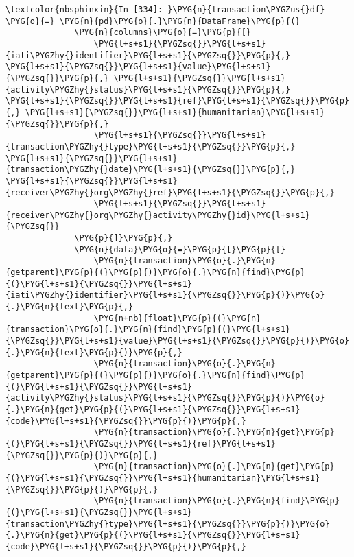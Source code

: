 \documentclass[letterpaper,10pt,english]{sphinxmanual}
\begin{document}
\begin{Verbatim}[commandchars=\\\{\}]
\textcolor{nbsphinxin}{In [334]: }\PYG{n}{transaction\PYGZus{}df} \PYG{o}{=} \PYG{n}{pd}\PYG{o}{.}\PYG{n}{DataFrame}\PYG{p}{(}
              \PYG{n}{columns}\PYG{o}{=}\PYG{p}{[}
                  \PYG{l+s+s1}{\PYGZsq{}}\PYG{l+s+s1}{iati\PYGZhy{}identifier}\PYG{l+s+s1}{\PYGZsq{}}\PYG{p}{,} \PYG{l+s+s1}{\PYGZsq{}}\PYG{l+s+s1}{value}\PYG{l+s+s1}{\PYGZsq{}}\PYG{p}{,} \PYG{l+s+s1}{\PYGZsq{}}\PYG{l+s+s1}{activity\PYGZhy{}status}\PYG{l+s+s1}{\PYGZsq{}}\PYG{p}{,} \PYG{l+s+s1}{\PYGZsq{}}\PYG{l+s+s1}{ref}\PYG{l+s+s1}{\PYGZsq{}}\PYG{p}{,} \PYG{l+s+s1}{\PYGZsq{}}\PYG{l+s+s1}{humanitarian}\PYG{l+s+s1}{\PYGZsq{}}\PYG{p}{,}
                  \PYG{l+s+s1}{\PYGZsq{}}\PYG{l+s+s1}{transaction\PYGZhy{}type}\PYG{l+s+s1}{\PYGZsq{}}\PYG{p}{,} \PYG{l+s+s1}{\PYGZsq{}}\PYG{l+s+s1}{transaction\PYGZhy{}date}\PYG{l+s+s1}{\PYGZsq{}}\PYG{p}{,} \PYG{l+s+s1}{\PYGZsq{}}\PYG{l+s+s1}{receiver\PYGZhy{}org\PYGZhy{}ref}\PYG{l+s+s1}{\PYGZsq{}}\PYG{p}{,}
                  \PYG{l+s+s1}{\PYGZsq{}}\PYG{l+s+s1}{receiver\PYGZhy{}org\PYGZhy{}activity\PYGZhy{}id}\PYG{l+s+s1}{\PYGZsq{}}
              \PYG{p}{]}\PYG{p}{,}
              \PYG{n}{data}\PYG{o}{=}\PYG{p}{[}\PYG{p}{[}
                  \PYG{n}{transaction}\PYG{o}{.}\PYG{n}{getparent}\PYG{p}{(}\PYG{p}{)}\PYG{o}{.}\PYG{n}{find}\PYG{p}{(}\PYG{l+s+s1}{\PYGZsq{}}\PYG{l+s+s1}{iati\PYGZhy{}identifier}\PYG{l+s+s1}{\PYGZsq{}}\PYG{p}{)}\PYG{o}{.}\PYG{n}{text}\PYG{p}{,}
                  \PYG{n+nb}{float}\PYG{p}{(}\PYG{n}{transaction}\PYG{o}{.}\PYG{n}{find}\PYG{p}{(}\PYG{l+s+s1}{\PYGZsq{}}\PYG{l+s+s1}{value}\PYG{l+s+s1}{\PYGZsq{}}\PYG{p}{)}\PYG{o}{.}\PYG{n}{text}\PYG{p}{)}\PYG{p}{,}
                  \PYG{n}{transaction}\PYG{o}{.}\PYG{n}{getparent}\PYG{p}{(}\PYG{p}{)}\PYG{o}{.}\PYG{n}{find}\PYG{p}{(}\PYG{l+s+s1}{\PYGZsq{}}\PYG{l+s+s1}{activity\PYGZhy{}status}\PYG{l+s+s1}{\PYGZsq{}}\PYG{p}{)}\PYG{o}{.}\PYG{n}{get}\PYG{p}{(}\PYG{l+s+s1}{\PYGZsq{}}\PYG{l+s+s1}{code}\PYG{l+s+s1}{\PYGZsq{}}\PYG{p}{)}\PYG{p}{,}
                  \PYG{n}{transaction}\PYG{o}{.}\PYG{n}{get}\PYG{p}{(}\PYG{l+s+s1}{\PYGZsq{}}\PYG{l+s+s1}{ref}\PYG{l+s+s1}{\PYGZsq{}}\PYG{p}{)}\PYG{p}{,}
                  \PYG{n}{transaction}\PYG{o}{.}\PYG{n}{get}\PYG{p}{(}\PYG{l+s+s1}{\PYGZsq{}}\PYG{l+s+s1}{humanitarian}\PYG{l+s+s1}{\PYGZsq{}}\PYG{p}{)}\PYG{p}{,}
                  \PYG{n}{transaction}\PYG{o}{.}\PYG{n}{find}\PYG{p}{(}\PYG{l+s+s1}{\PYGZsq{}}\PYG{l+s+s1}{transaction\PYGZhy{}type}\PYG{l+s+s1}{\PYGZsq{}}\PYG{p}{)}\PYG{o}{.}\PYG{n}{get}\PYG{p}{(}\PYG{l+s+s1}{\PYGZsq{}}\PYG{l+s+s1}{code}\PYG{l+s+s1}{\PYGZsq{}}\PYG{p}{)}\PYG{p}{,}

\end{Verbatim}
\end{document}
